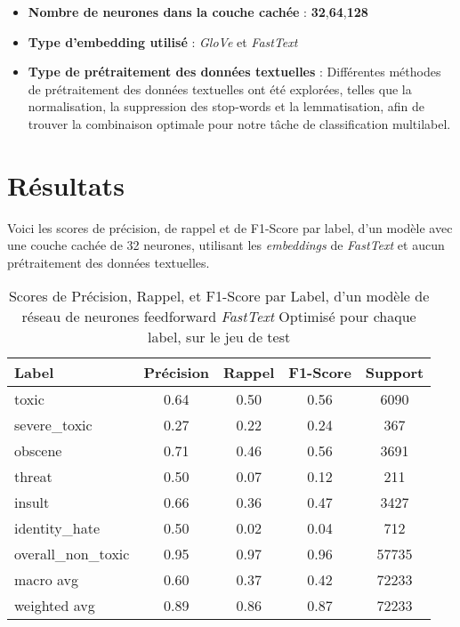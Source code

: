 \begin{itemize}
    \item \textbf{Nombre de neurones dans la couche cachée} : \textbf{32},\textbf{64},\textbf{128}
    \item \textbf{Type d'embedding utilisé} : \textit{GloVe} et \textit{FastText}
    \item \textbf{Type de prétraitement des données textuelles} : Différentes méthodes de prétraitement des données textuelles ont été explorées, telles que la normalisation, la suppression des stop-words et la lemmatisation, afin de trouver la combinaison optimale pour notre tâche de classification multilabel.
\end{itemize}


\section{Résultats}

Voici les scores de précision, de rappel et de F1-Score par label, d'un modèle avec une couche cachée de 32 neurones, utilisant les \textit{embeddings} de \textit{FastText} et aucun prétraitement des données textuelles.

\begin{table}[ht]
    \centering
    \caption{Scores de Précision, Rappel, et F1-Score par Label, d'un modèle de réseau de neurones feedforward \textit{FastText} Optimisé pour chaque label, sur le jeu de test}    \begin{tabular}{lcccc}
    \hline
    \textbf{Label} & \textbf{Précision} & \textbf{Rappel} & \textbf{F1-Score} & \textbf{Support} \\ \hline
    toxic          & 0.64               & 0.50            & 0.56              & 6090             \\
    severe\_toxic  & 0.27               & 0.22            & 0.24              & 367              \\
    obscene        & 0.71               & 0.46            & 0.56              & 3691             \\
    threat         & 0.50               & 0.07            & 0.12              & 211              \\
    insult         & 0.66               & 0.36            & 0.47              & 3427             \\
    identity\_hate & 0.50               & 0.02            & 0.04              & 712              \\
    overall\_non\_toxic & 0.95           & 0.97            & 0.96              & 57735            \\\hline
    macro avg      & 0.60              & 0.37            & 0.42              & 72233            \\
    weighted avg   & 0.89               & 0.86            & 0.87              & 72233            \\ \hline
    \end{tabular}
    \label{tab:scores}
\end{table}

